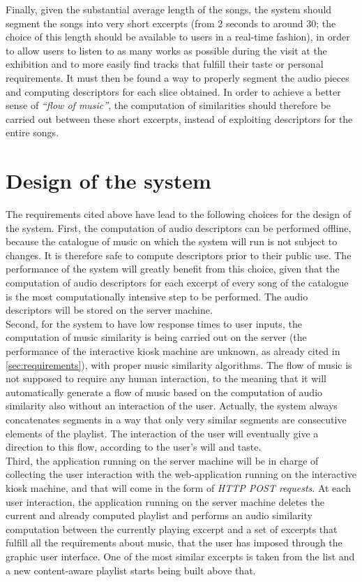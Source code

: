 Finally, given the substantial average length of the songs, the system should segment the songs into very short excerpts (from 2 seconds to around 30; the choice of this length should be available to users in a real-time fashion), in order to allow users to listen to as many works as possible during the visit at the exhibition and to more easily find tracks that fulfill their taste or personal requirements. It must then be found a way to properly segment the audio pieces and computing descriptors for each slice obtained. In order to achieve a better sense of \textit{``flow of music''}, the computation of similarities should therefore be carried out between these short excerpts, instead of exploiting descriptors for the entire songs.

\section{Design of the system}
The requirements cited above have lead to the following choices for the design of the system. First, the computation of audio descriptors can be performed offline, because the catalogue of music on which the system will run is not subject to changes. It is therefore safe to compute descriptors prior to their public use. The performance of the system will greatly benefit from this choice, given that the computation of audio descriptors for each excerpt of every song of the catalogue is the most computationally intensive step to be performed. The audio descriptors will be stored on the server machine.\\ Second, for the system to have low response times to user inputs, the computation of music similarity is being carried out on the server (the performance of the interactive kiosk machine are unknown, as already cited in \ref{sec:requirements}), with proper music similarity algorithms. The flow of music is not supposed to require any human interaction, to the meaning that it will automatically generate a flow of music based on the computation of audio similarity also without an interaction of the user. Actually, the system always concatenates segments in a way that only very similar segments are consecutive elements of the playlist. The interaction of the user will eventually give a direction to this flow, according to the user's will and taste. \\ Third, the application running on the server machine will be in charge of collecting the user interaction with the web-application running on the interactive kiosk machine, and that will come in the form of \textit{HTTP POST requests}. At each user interaction, the application running on the server machine deletes the current and already computed playlist and performs an audio similarity computation between the currently playing excerpt and a set of excerpts that fulfill all the requirements about music, that the user has imposed through the graphic user interface. One of the most similar excerpts is taken from the list and a new content-aware playlist starts being built above that. 

